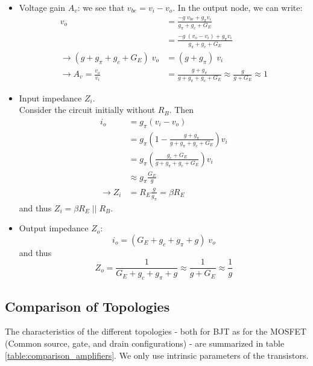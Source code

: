 \begin{itemize}
	\item Voltage gain $A_v$: we see that $v_{be} = v_i - v_o$. In the output node, we can write:
	\begin{equation}
		\begin{split}
			v_o &= \frac{-g \; v_{be} + g_{\pi} v_i}{g_{\pi}  + g_c + G_E}\\
			&= \frac{-g \; (v_o - v_i) + g_{\pi} v_i}{g_{\pi}  + g_c + G_E}\\
			\rightarrow (g + g_{\pi}  + g_c + G_E) \; v_o &= (g + g_{\pi}) \; v_i\\
			\rightarrow  A_v = \frac{v_o}{v_i} &= \frac{g + g_{\pi}}{g + g_{\pi}  + g_c + G_E} \approx \frac{g}{g+G_E} \approx 1
		\end{split}
	\end{equation}
	\item Input impedance $Z_i$.\\
	Consider the circuit initially without $R_B$. Then
	\begin{equation}
		\begin{split}
			i_o &= g_\pi (v_i - v_o) \\
				&= g_\pi (1 - \frac{g + g_{\pi}}{g + g_{\pi}  + g_c + G_E}) v_i\\
				&= 	g_\pi (\frac{g_c + G_E}{g + g_{\pi}  + g_c + G_E}) v_i\\
				&\approx g_\pi \frac{G_E}{g} \\
			\rightarrow Z_i &= R_E \frac{g}{g_\pi} = \beta R_E
		\end{split}
	\end{equation}
	and thus $Z_i = \beta R_E \; || \; R_B$.
	\item Output impedance $Z_o$:
	$$i_o = (G_E + g_c + g_{\pi} + g)\; v_o$$
	and thus 
	$$Z_o = \frac{1}{G_E + g_c + g_{\pi} + g} \approx \frac{1}{g + G_E} \approx \frac{1}{g}$$
\end{itemize}

\subsection{Comparison of Topologies}
The characteristics of the different topologies - both for BJT as for the MOSFET (Common source, gate, and drain configurations) - are summarized in table \ref{table:comparison_amplifiers}. We only use intrinsic parameters of the transistors.

